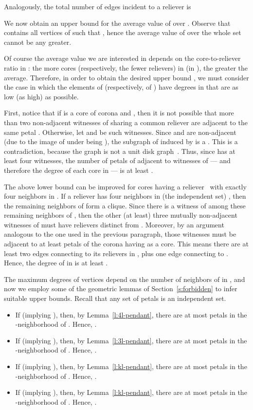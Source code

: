 \documentclass[preprint,12pt]{elsarticle}
\begin{document}
\begin{pf}
Analogously,
the total number of edges incident to a reliever  is



We now obtain an upper bound  for the average value of  \linebreak over . Observe that  contains all vertices  of  such \linebreak that , hence the average value  of  over the whole set  cannot be any greater.

Of course the average value we are interested in depends on the core-to-reliever ratio  in : the more cores (respectively, the fewer relievers) in  (in ), the greater the average. Therefore, in order to obtain the desired upper bound , we must consider the case in which the elements of  (respectively, of ) have degrees in  that are as low (as high) as possible.

First, notice that if  is a core of corona  and , then it is not possible that more than two non-adjacent witnesses of  sharing a common reliever  are adjacent to the same petal . Otherwise, let  and  be such witnesses. Since  and  are non-adjacent (due to the image of  under  being ), the subgraph of  induced by  is a . This is a contradiction, because the graph  is not a unit disk graph~\cite{vanLeeuwen}. Thus, since  has at least four witnesses, the number of petals of  adjacent to witnesses of  --- and therefore the degree of each core in  --- is at least . 

The above lower bound can be improved for cores  having a \mbox{reliever } with exactly four neighbors in . If a reliever  has four neighbors in (the independent set) , then the remaining neighbors of  form a clique. Since there is a witness  of  among these remaining neighbors of , then the other (at least) three mutually non-adjacent witnesses of  must have relievers distinct from . Moreover, by an argument analogous to the one used in the previous paragraph, those witnesses must be adjacent to at least  petals of the corona having  as a core. This means there are at least two edges connecting  to its relievers in , plus one edge connecting  to . Hence, the degree \linebreak of  in  is at least .

The maximum degrees of vertices  depend on the number  of neighbors of  in , and now we employ some of the geometric lemmas of Section~\ref{s:forbidden} to infer suitable upper bounds. Recall that any set of petals is an independent set.
\begin{itemize}
\item If  (implying ), then, by Lemma~\ref{l:4l-pendant}, there are at most  petals in the -neighborhood of . Hence, .
\item If  (implying ), then, by Lemma~\ref{l:3l-pendant}, there are at most  petals in the -neighborhood of . Hence, .
\item If  (implying ), then, by Lemma~\ref{l:kl-pendant}, there are at most  petals in the -neighborhood of . Hence, .
\item If  (implying ), then, by Lemma~\ref{l:kl-pendant}, there are at most  petals in the -neighborhood of . Hence, .
\end{itemize}


\end{pf}
\end{document}
